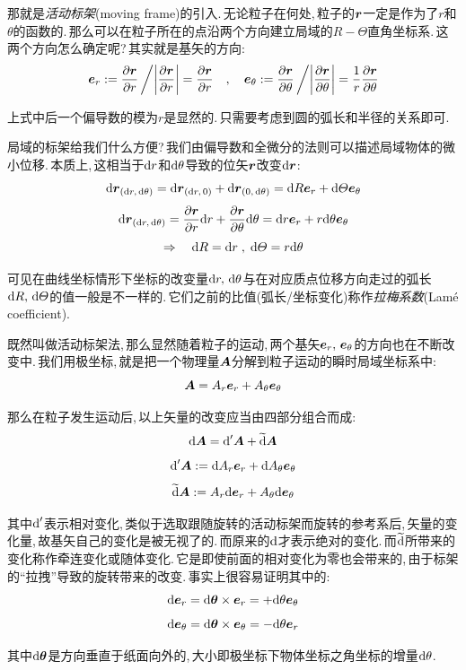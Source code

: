 那就是\emph{活动标架}(moving frame)的引入.\,无论粒子在何处,\,粒子的$\boldsymbol{r}$一定是作为了$r$和$\theta$的函数的.\,那么可以在粒子所在的点沿两个方向建立局域的$R-\varTheta$直角坐标系.\,这两个方向怎么确定呢?\,其实就是基矢的方向:
\[\boldsymbol{e}_r:=\frac{\partial\boldsymbol{r}}{\partial r}\left/\middle|\frac{\partial\boldsymbol{r}}{\partial r}\right|=\frac{\partial\boldsymbol{r}}{\partial r}\quad,\quad \boldsymbol{e}_\theta:=\frac{\partial\boldsymbol{r}}{\partial \theta}\left/\middle|\frac{\partial\boldsymbol{r}}{\partial \theta}\right|=\frac{1}{r}\frac{\partial\boldsymbol{r}}{\partial \theta}\]

上式中后一个偏导数的模为$r$是显然的.\,只需要考虑到圆的弧长和半径的关系即可.

局域的标架给我们什么方便?\,我们由偏导数和全微分的法则可以描述局域物体的微小位移.\,本质上,\,这相当于$\textrm{d} r$和$\textrm{d} \theta$导致的位矢$\boldsymbol{r}$改变$\textrm{d} \boldsymbol{r}$:
\[\textrm{d} \boldsymbol{r}_{(\textrm{d} r,\,\textrm{d} \theta)}=\textrm{d} \boldsymbol{r}_{(\textrm{d} r,\,0)}+\textrm{d} \boldsymbol{r}_{(0,\,\textrm{d} \theta)}=\textrm{d} R\boldsymbol{e}_r+\textrm{d} \varTheta\boldsymbol{e}_\theta\]
\[\textrm{d} \boldsymbol{r}_{(\textrm{d} r,\,\textrm{d} \theta)}=\frac{\partial \boldsymbol{r}}{\partial r}\textrm{d} r+\frac{\partial \boldsymbol{r}}{\partial \theta}\textrm{d} \theta=\textrm{d} r\boldsymbol{e}_r+r\textrm{d} \theta \boldsymbol{e}_\theta\]
\[\Rightarrow \quad \textrm{d} R=\textrm{d} r\;,\;\textrm{d} \varTheta=r\textrm{d} \theta\]

可见在曲线坐标情形下坐标的改变量$\textrm{d} r,\,\textrm{d} \theta$与在对应质点位移方向走过的弧长$\textrm{d} R,\,\textrm{d} \varTheta$的值一般是不一样的.\,它们之前的比值(弧长/坐标变化)称作\emph{拉梅系数}(Lam\'e coefficient).

\vspace{0.5cm}
既然叫做活动标架法,\,那么显然随着粒子的运动,\,两个基矢$\boldsymbol{e}_r,\,\boldsymbol{e}_\theta$的方向也在不断改变中.\,我们用极坐标,\,就是把一个物理量$\boldsymbol{A}$分解到粒子运动的瞬时局域坐标系中:
\[\boldsymbol{A}=A_r\boldsymbol{e}_r+A_\theta\boldsymbol{e}_\theta\]

那么在粒子发生运动后,\,以上矢量的改变应当由四部分组合而成:
\[\textrm{d} \boldsymbol{A}=\textrm{d}'\boldsymbol{A}+\widetilde{\textrm{d}}\boldsymbol{A} \]
\[\textrm{d}' \boldsymbol{A}:=\textrm{d} A_r\boldsymbol{e}_r+\textrm{d} A_\theta\boldsymbol{e}_\theta\]
\[\widetilde{\textrm{d}}\boldsymbol{A}:= A_r\textrm{d}\boldsymbol{e}_r+ A_\theta\textrm{d}\boldsymbol{e}_\theta\]

其中$\textrm{d}'$表示相对变化,\,类似于选取跟随旋转的活动标架而旋转的参考系后,\,矢量的变化量,\,故基矢自己的变化是被无视了的.\,而原来的$\textrm{d}$才表示绝对的变化.\,而$\widetilde{\textrm{d}}$所带来的变化称作牵连变化或随体变化.\,它是即使前面的相对变化为零也会带来的,\,由于标架的``拉拽''导致的旋转带来的改变.\,事实上很容易证明其中的:
\[\textrm{d} \boldsymbol{e}_r=\textrm{d} \boldsymbol{\theta}\times \boldsymbol{e}_r=+\textrm{d} \theta \boldsymbol{e}_\theta\]
\[\textrm{d} \boldsymbol{e}_\theta=\textrm{d} \boldsymbol{\theta}\times \boldsymbol{e}_\theta=-\textrm{d} \theta \boldsymbol{e}_r\]

其中$\textrm{d} \boldsymbol{\theta}$是方向垂直于纸面向外的,\,大小即极坐标下物体坐标之角坐标的增量$\textrm{d} \theta$.


